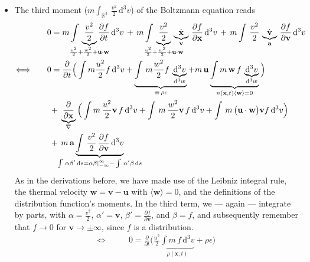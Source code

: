 \begin{itemize}
 \item The third moment ($m \int_{\mathbb{R}^{3}}\,\frac{v^{2}}{2}\,\mathrm{d}^{3}v$) of the Boltzmann equation reads
 \begin{align*}
  &0 = m \int\,\underbrace{ \frac{v^{2}}{2} }_{\mathclap{\frac{u^{2}}{2}+\frac{w^{2}}{2}+\textbf{u}\cdot\textbf{w}}}\frac{\partial f}{\partial t}\,\mathrm{d}^{3}v \,+\, m \int\,\underbrace{ \frac{v^{2}}{2} }_{\mathclap{\frac{u^{2}}{2}+\frac{w^{2}}{2}+\textbf{u}\cdot\textbf{w}}}\,\underbrace{ \dot{\textbf{x}} }_{\textbf{v}}\,\frac{\partial f}{\partial \textbf{x}}\,\mathrm{d}^{3}v \,+\, m \int\,\frac{v^{2}}{2}\,\underbrace{ \dot{\textbf{v}} }_{\textbf{a}}\,\frac{\partial f}{\partial \textbf{v}}\,\mathrm{d}^{3}v \\
  \Longleftrightarrow\qquad
  &0 = \frac{\partial}{\partial t}\Big( \int m \frac{u^{2}}{2}f\,\mathrm{d}^{3}v + \underbrace{ \int\,m \frac{w^{2}}{2}f\,\underbrace{ \mathrm{d}^{3}v }_{\mathrm{d}^{3}w} }_{\mathclap{\equiv\,\rho\epsilon}} + m\,\textbf{u}\underbrace{ \int m\,\textbf{w}\,f\,\underbrace{ \mathrm{d}^{3}v }_{\mathrm{d}^{3}w} }_{n(\textbf{x}, t)\langle \textbf{w}\rangle = 0} \Big) \\
   &\hspace{3pt} +\, \underbrace{ \frac{\partial}{\partial\textbf{x}} }_{\nabla}\Big( \int m\,\frac{u^{2}}{2}\textbf{v}\,f\,\mathrm{d}^{3}v + \int\,m\,\frac{w^{2}}{2}\textbf{v}\,f\,\mathrm{d}^{3}v + \int\,m\,\big(\textbf{u}\cdot\textbf{w}\big)\textbf{v} f\,\mathrm{d}^{3}v \Big) \\
   &\hspace{3pt} +\, m\,\textbf{a} \underbrace{\int\,\frac{v^{2}}{2}\,\frac{\partial f}{\partial \textbf{v}}\,\mathrm{d}^{3}v }_{\mathclap{\int\,\alpha\beta'\,\mathrm{d}s = \alpha\beta\mid_{-\infty}^{\infty} - \int\,\alpha'\beta\,\mathrm{d}s}}
 \end{align*}
 As in the derivations before, we have made use of the Leibniz integral rule, the thermal velocity $\textbf{w} = \textbf{v} - \textbf{u}$ with $\langle \textbf{w}\rangle = 0$, and the definitions of the distribution function's moments.
 In the third term, we --- again --- integrate by parts, with $\alpha = \frac{v^{2}}{2}$, $\alpha' = \textbf{v}$, $\beta' = \frac{\partial f}{\partial\textbf{v}}$, and $\beta = f$, and subsequently remember that $f \rightarrow 0$ for $\textbf{v} \rightarrow \pm \infty$, since $f$ is a distribution.
 \begin{align*}
  \Longleftrightarrow\qquad
  &0 = \frac{\partial}{\partial t}\Big( \frac{u^{2}}{2}\underbrace{ \int m\,f\,\mathrm{d}^{3}v }_{\rho(\textbf{x}, t)} + \rho\epsilon \Big) \\

\end{align*}
\end{itemize}
